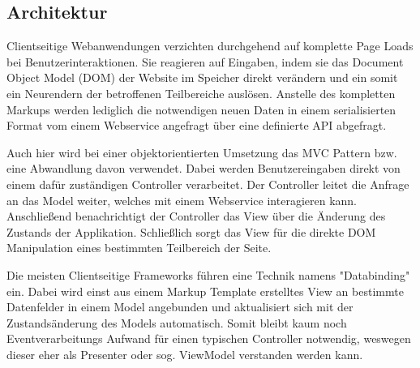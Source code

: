 \subsection{Architektur}

Clientseitige Webanwendungen verzichten durchgehend auf komplette Page Loads bei Benutzerinteraktionen. Sie reagieren auf Eingaben, indem sie das Document Object Model (DOM) der Website im Speicher direkt verändern und ein somit ein Neurendern der betroffenen Teilbereiche auslösen. Anstelle des kompletten Markups werden lediglich die notwendigen neuen Daten in einem serialisierten Format vom einem Webservice angefragt über eine definierte API abgefragt. 

Auch hier wird bei einer objektorientierten Umsetzung das MVC Pattern bzw. eine Abwandlung davon verwendet. Dabei werden Benutzereingaben direkt von einem dafür zuständigen Controller verarbeitet. Der Controller leitet die Anfrage an das Model weiter, welches mit einem Webservice interagieren kann. Anschließend benachrichtigt der Controller das View über die Änderung des Zustands der Applikation. Schließlich sorgt das View für die direkte DOM Manipulation eines bestimmten Teilbereich der Seite.

Die meisten Clientseitige Frameworks führen eine Technik namens "Databinding" ein.
Dabei wird einst aus einem Markup Template erstelltes View an bestimmte Datenfelder in einem Model angebunden und aktualisiert sich mit der Zustandsänderung des Models automatisch. Somit bleibt kaum noch Eventverarbeitungs Aufwand für einen typischen Controller notwendig, weswegen dieser eher als Presenter oder sog. ViewModel verstanden werden kann.


    



